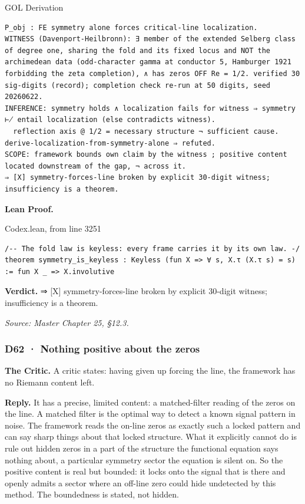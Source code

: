 \documentclass[10pt,twocolumn]{article}
\begin{document}
\begin{golbox}{GOL Derivation}
\begin{lstlisting}[style=golv]
P_obj : FE symmetry alone forces critical-line localization.
WITNESS (Davenport-Heilbronn): ∃ member of the extended Selberg class of degree one, sharing the fold and its fixed locus and NOT the archimedean data (odd-character gamma at conductor 5, Hamburger 1921 forbidding the zeta completion), ∧ has zeros OFF Re = 1/2. verified 30 sig-digits (record); completion check re-run at 50 digits, seed 20260622.
INFERENCE: symmetry holds ∧ localization fails for witness ⇒ symmetry ⊬ entail localization (else contradicts witness).
  reflection axis @ 1/2 = necessary structure ¬ sufficient cause.  derive-localization-from-symmetry-alone ⇒ refuted.
SCOPE: framework bounds own claim by the witness ; positive content located downstream of the gap, ¬ across it.
⇒ [X] symmetry-forces-line broken by explicit 30-digit witness; insufficiency is a theorem.
\end{lstlisting}
\end{golbox}

\textbf{Lean Proof.}

\begin{leanexcerpt}{Codex.lean, from line 3251}
\begin{lstlisting}[style=leanx,firstnumber=3251]
/-- The fold law is keyless: every frame carries it by its own law. -/
theorem symmetry_is_keyless : Keyless (fun X => ∀ s, X.τ (X.τ s) = s) := fun X _ => X.involutive
\end{lstlisting}
\end{leanexcerpt}

\textbf{Verdict.} ⇒ {[}X{]} symmetry-forces-line broken by explicit
30-digit witness; insufficiency is a theorem.

\emph{Source: Master Chapter 25, §12.3.}

\hypertarget{d62-nothing-positive-about-the-zeros}{%
\subsubsection{D62 · Nothing positive about the
zeros}\label{d62-nothing-positive-about-the-zeros}}

\textbf{The Critic.} A critic states: having given up forcing the line,
the framework has no Riemann content left.

\textbf{Reply.} It has a precise, limited content: a matched-filter
reading of the zeros on the line. A matched filter is the optimal way to
detect a known signal pattern in noise. The framework reads the on-line
zeros as exactly such a locked pattern and can say sharp things about
that locked structure. What it explicitly cannot do is rule out hidden
zeros in a part of the structure the functional equation says nothing
about, a particular symmetry sector the equation is silent on. So the
positive content is real but bounded: it locks onto the signal that is
there and openly admits a sector where an off-line zero could hide
undetected by this method. The boundedness is stated, not hidden.
\end{document}
